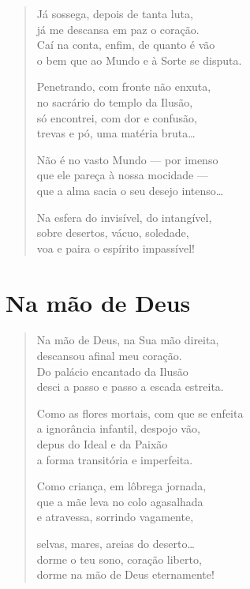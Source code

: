 \documentclass[10pt,a5paper,oneside]{book}
\begin{document}
\begin{verse}
Já sossega, depois de tanta luta,\\
já me descansa em paz o coração.\\
Caí na conta, enfim, de quanto é vão\\
o bem que ao Mundo e à Sorte se disputa.

Penetrando, com fronte não enxuta,\\
no sacrário do templo da Ilusão,\\
só encontrei, com dor e confusão,\\
trevas e pó, uma matéria bruta\ldots{}

Não é no vasto Mundo --- por imenso\\
que ele pareça à nossa mocidade ---\\
que a alma sacia o seu desejo intenso\ldots{}

Na esfera do invisível, do intangível,\\
sobre desertos, vácuo, soledade,\\
voa e paira o espírito impassível!
\end{verse}

\chapter{Na mão de Deus}

\begin{verse}
Na mão de Deus, na Sua mão direita,\\
descansou afinal meu coração.\\
Do palácio encantado da Ilusão\\
desci a passo e passo a escada estreita.

Como as flores mortais, com que se enfeita\\
a ignorância infantil, despojo vão,\\
depus do Ideal e da Paixão\\
a forma transitória e imperfeita.

Como criança, em lôbrega jornada,\\
que a mãe leva no colo agasalhada\\
e atravessa, sorrindo vagamente,

selvas, mares, areias do deserto\ldots{}\\
dorme o teu sono, coração liberto,\\
dorme na mão de Deus eternamente!
\end{verse}
\end{document}
